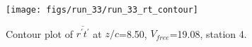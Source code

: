 \begin{figure}[H]
\centering
\texttt{[image: figs/run\_33/run\_33\_rt\_contour]}
\caption{Contour plot of $\overline{r^\prime t^\prime}$ at $z/c$=8.50, $V_{free}$=19.08, station 4.}
\label{fig:run_33_rt_contour}
\end{figure}


